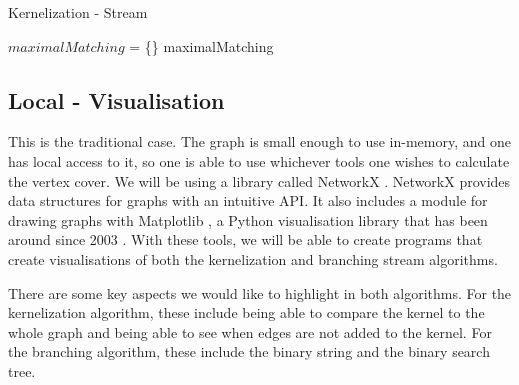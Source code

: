 \begin{algorithm}[htb]
    \caption{Kernelization - Stream}
    \label{alg:kernelization_stream}
    \DontPrintSemicolon


    $maximalMatching$ = \{\}\;
    \Return maximalMatching\;
\end{algorithm}

\subsection{Local - Visualisation}

This is the traditional case. The graph is small enough to use in-memory, and
one has local access to it, so one is able to use whichever tools one wishes to
calculate the vertex cover. We will be using a library called NetworkX
\cite{hagberg2008exploring}. NetworkX provides data structures for graphs with
an intuitive API. It also includes a module for drawing graphs with Matplotlib
\cite{hunter2007matplotlib}, a Python visualisation library that has been
around since 2003 \cite{matplotlib2003copyright}. With these tools, we will be
able to create programs that create visualisations of both the kernelization
and branching stream algorithms.

There are some key aspects we would like to highlight in both algorithms. For
the kernelization algorithm, these include being able to compare the kernel to
the whole graph and being able to see when edges are not added to the kernel.
For the branching algorithm, these include the binary string and the binary
search tree.

